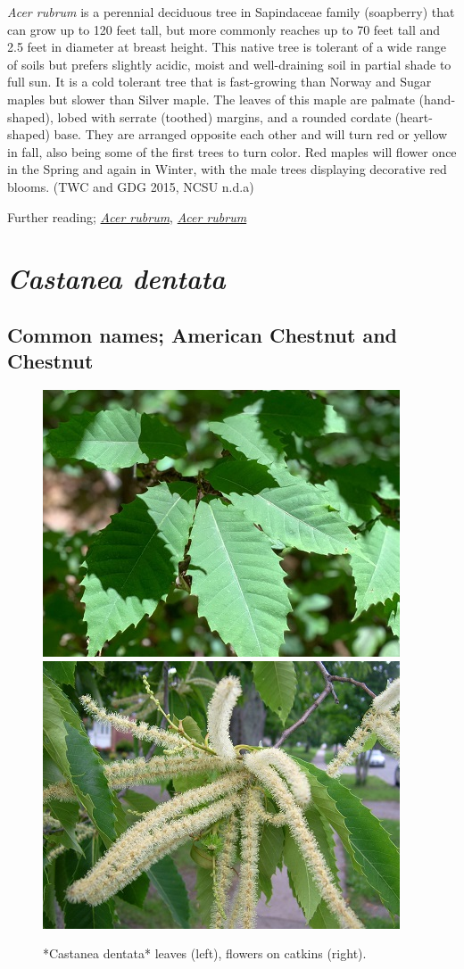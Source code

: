 \documentclass[
]{article}
\begin{document}
\emph{Acer rubrum} is a perennial deciduous tree in Sapindaceae family (soapberry) that can grow up to 120 feet tall, but more commonly reaches up to 70 feet tall and 2.5 feet in diameter at breast height. This native tree is tolerant of a wide range of soils but prefers slightly acidic, moist and well-draining soil in partial shade to full sun. It is a cold tolerant tree that is fast-growing than Norway and Sugar maples but slower than Silver maple. The leaves of this maple are palmate (hand-shaped), lobed with serrate (toothed) margins, and a rounded cordate (heart-shaped) base. They are arranged opposite each other and will turn red or yellow in fall, also being some of the first trees to turn color. Red maples will flower once in the Spring and again in Winter, with the male trees displaying decorative red blooms. (TWC and GDG 2015, NCSU n.d.a)

Further reading; \href{https://plants.ces.ncsu.edu/plants/acer-rubrum/}{\emph{Acer rubrum}}, \href{https://www.wildflower.org/plants/result.php?id_plant=acru}{\emph{Acer rubrum}}

\hypertarget{castanea-dentata}{%
\section{\texorpdfstring{\emph{Castanea dentata}}{Castanea dentata}}\label{castanea-dentata}}

\hypertarget{common-names-american-chestnut-and-chestnut}{%
\subsection{Common names; American Chestnut and Chestnut}\label{common-names-american-chestnut-and-chestnut}}

\begin{figure}

{\centering \includegraphics[width=0.5\linewidth]{castden} \includegraphics[width=0.5\linewidth]{castflower} 

}

\caption{*Castanea dentata* leaves (left), flowers on catkins (right).}\label{fig:cast}
\end{figure}
\end{document}
